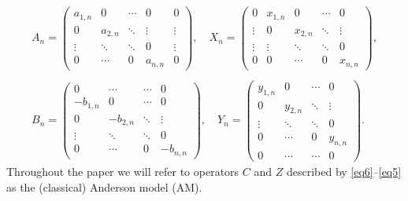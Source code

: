 \documentclass[10pt,reqno]{amsart}
\theoremstyle{remark}
\numberwithin{equation}{section}
\begin{document}
\begin{equation}
  \label{eq5}
  \begin{gathered}
    A_n=
    \begin{pmatrix}
      a_{1,n} & 0 & \cdots   & 0 & 0 \\
      0 & a_{2,n}  & \ddots  & \vdots & \vdots \\
      \vdots &\ddots & \ddots & 0 & \vdots \\
      0 & \cdots & 0 & a_{n,n} & 0
    \end{pmatrix},\quad
    X_n=
    \begin{pmatrix}
      0 & x_{1,n} & 0  & \cdots & 0 \\
      \vdots & 0 & x_{2,n} & \ddots & \vdots \\
      \vdots & \vdots & \ddots & \ddots & 0 \\
      0 & 0 & \cdots & 0 & x_{n,n}
    \end{pmatrix},\\
    \\
    B_n=
    \begin{pmatrix}
      0 & \cdots &\cdots & 0 \\
      -b_{1,n} & 0 & \cdots & 0 \\
      0 &-b_{2,n}  & \ddots & \vdots \\
      \vdots & \ddots & \ddots & 0 \\
      0 & \cdots & 0 & -b_{n,n}
    \end{pmatrix},\quad
    Y_n=
    \begin{pmatrix}
      y_{1,n} & 0  & \cdots  & 0 \\
      0 & y_{2,n} & \ddots & \vdots \\
      \vdots & \ddots & \ddots & 0 \\
      0 & \cdots & 0 & y_{n,n}\\
      0 & \cdots & \cdots & 0
    \end{pmatrix}.
  \end{gathered}
\end{equation}
Throughout the paper we will refer to operators $C$ and $Z$ described by \eqref{eq6}--\eqref{eq5} as the (classical) Anderson model (AM).
\end{document}
